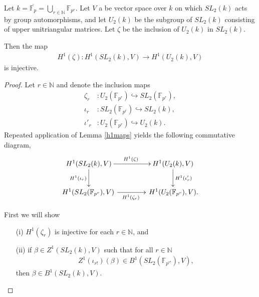\begin{example} \label{ab_example}
	Let $k = \overline{\mathbb{F}_p} = \bigcup_{r\in \mathbb{N}} \mathbb{F}_{p^r}$.
Let $V$ a be vector space over $k$ on which $SL_2(k)$ acts by group automorphisms, and let $U_2(k)$ be the subgroup of $SL_2(k)$ consisting of upper unitriangular matrices. Let $\zeta$ be the inclusion of $U_2(k)$ in $SL_2(k)$.

Then the map
	\begin{align}
		H^1(\zeta): H^1(SL_2(k), V) \rightarrow H^1(U_2(k), V)
	\end{align}
	is injective.
\label{eg:sl2ab}
\end{example}
\begin{proof}
	Let $r \in \mathbb{N}$ and denote the inclusion maps
\begin{align*}
	\zeta_r&:U_2(\mathbb{F}_{p^r}) \hookrightarrow SL_2(\mathbb{F}_{p^r}), \\
	\iota_r&:SL_2(\mathbb{F}_{p^r}) \hookrightarrow SL_2(k), \\
	\iota'_r&:U_2(\mathbb{F}_{p^r}) \hookrightarrow U_2(k).
\end{align*}
Repeated application of Lemma \ref{h1maps} yields the following commutative diagram,
\begin{align*}
	\xymatrix@C=40pt{
		H^1(SL_2(k), V) \ar[r]^{H^1(\zeta)} \ar[d]_{H^1(\iota_r)} & H^1(U_2(k), V) \ar[d]^{H^1(\iota'_r)} \\
		H^1(SL_2(\mathbb{F}_{p^r}), V)\, \ar[r]_{H^1(\zeta_r)} &\, H^1(U_2(\mathbb{F}_{p^r}), V).
	}
\end{align*}

First we will show
\begin{itemize}
\item [(i)] $H^1(\zeta_r)$ is injective for each $r \in \mathbb{N}$, and
\item [(ii)] if $\beta \in Z^1(SL_2(k), V)$ such that for all $r \in \mathbb{N}$
\begin{align*} Z^1(\iota_{r!})(\beta) \in B^1(SL_2(\mathbb{F}_{p^{r!}}), V),
\end{align*}
then $\beta \in B^1(SL_2(k), V)$.
\end{itemize}


\end{proof}
